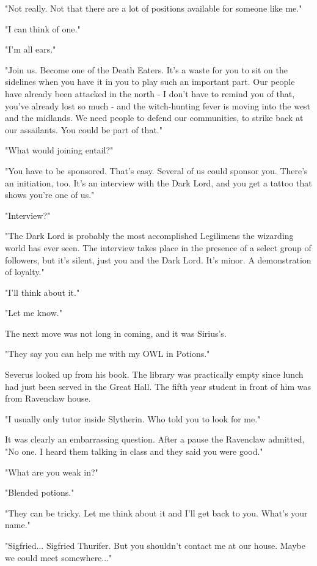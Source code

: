 \documentclass[a4paper,11pt]{article}
\begin{document}
"Not really. Not that there are a lot of positions available for someone like me."

"I can think of one."

"I'm all ears."

"Join us. Become one of the Death Eaters. It's a waste for you to sit on the sidelines when you have it in you to play such an important part. Our people have already been attacked in the north - I don't have to remind you of that, you've already lost so much - and the witch-hunting fever is moving into the west and the midlands. We need people to defend our communities, to strike back at our assailants. You could be part of that."

"What would joining entail?"

"You have to be sponsored. That's easy. Several of us could sponsor you. There's an initiation, too. It's an interview with the Dark Lord, and you get a tattoo that shows you're one of us."

"Interview?"

"The Dark Lord is probably the most accomplished Legilimens the wizarding world has ever seen. The interview takes place in the presence of a select group of followers, but it's silent, just you and the Dark Lord. It's minor. A demonstration of loyalty."

"I'll think about it."

"Let me know."

The next move was not long in coming, and it was Sirius's.

"They say you can help me with my OWL in Potions."

Severus looked up from his book. The library was practically empty since lunch had just been served in the Great Hall. The fifth year student in front of him was from Ravenclaw house.

"I usually only tutor inside Slytherin. Who told you to look for me."

It was clearly an embarrassing question. After a pause the Ravenclaw admitted, "No one. I heard them talking in class and they said you were good."

"What are you weak in?"

"Blended potions."

"They can be tricky. Let me think about it and I'll get back to you. What's your name."

"Sigfried... Sigfried Thurifer. But you shouldn't contact me at our house. Maybe we could meet somewhere..."
\end{document}
